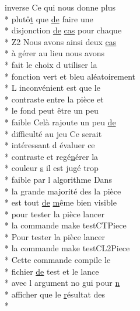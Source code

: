\begin{DoxyCompactItemize}
inverse Ce qui nous donne plus \\*
plutô\hyperlink{gl_8h_a00140d6f5c548b26daf170bf16e86a6d}{t} que \hyperlink{mainpage_8dox_ab37fa35e77d95c6d0d0ab620c97c3db8}{de} faire une \\*
disjonction \hyperlink{mainpage_8dox_ab37fa35e77d95c6d0d0ab620c97c3db8}{de} \hyperlink{mainpage_8dox_a28d908e91a20ecb016d27b941f85907c}{cas} pour chaque \\*
Z2 Nous avons ainsi deux \hyperlink{mainpage_8dox_a28d908e91a20ecb016d27b941f85907c}{cas} \\*
à \hyperlink{glext_8h_a9cd653b1648845554169fbc3a3f6d37a}{g}érer au lieu nous avons \\*
fait le choix d utiliser la \\*
fonction vert et bleu aléatoirement \\*
L inconvénient est que le \\*
contraste entre la pièce et \\*
le fond peut être un peu \\*
faible Celà rajoute un peu \hyperlink{mainpage_8dox_ab37fa35e77d95c6d0d0ab620c97c3db8}{de} \\*
difficulté au jeu Ce serait \\*
intéressant d évaluer ce \\*
contraste et regé\hyperlink{glext_8h_a0788d3762d0c3c76e4c094d8078b4c27}{n}érer la \\*
couleur \hyperlink{gl_8h_ad585a1393cfa368fa9dc3d8ebff640d5}{s} il est jugé trop \\*
faible par l algorithme Dans \\*
la grande majorité des la pièce \\*
est tout \hyperlink{mainpage_8dox_ab37fa35e77d95c6d0d0ab620c97c3db8}{de} \hyperlink{glext_8h_af593500c283bf1a787a6f947f503a5c2}{m}ême bien visible \\*
pour tester la pièce lancer \\*
la commande make test\-C\-T\-Piece \\*
Pour tester la pièce lancer \\*
la commande make test\-C\-L2\-Piece \\*
Cette commande compile le \\*
fichier \hyperlink{mainpage_8dox_ab37fa35e77d95c6d0d0ab620c97c3db8}{de} test et le lance \\*
avec l argument no gui pour \hyperlink{glext_8h_a0788d3762d0c3c76e4c094d8078b4c27}{n} \\*
afficher que le \hyperlink{gl_8h_abe08814c2f72843fde4d8df41440d5a0}{r}ésultat des \\*

\end{DoxyCompactItemize}
